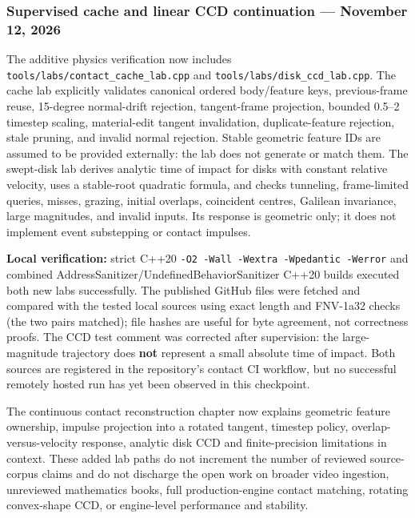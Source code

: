 \subsubsection{Supervised cache and linear CCD continuation --- November 12, 2026}\label{appendix-3b67654799a2-supervised-cache-and-linear-ccd-continuation-november-12-2026}

The additive physics verification now includes \texttt{tools/labs/contact\_cache\_lab.cpp} and \texttt{tools/labs/disk\_ccd\_lab.cpp}. The cache lab explicitly validates canonical ordered body/feature keys, previous-frame reuse, 15-degree normal-drift rejection, tangent-frame projection, bounded 0.5--2 timestep scaling, material-edit tangent invalidation, duplicate-feature rejection, stale pruning, and invalid normal rejection. Stable geometric feature IDs are assumed to be provided externally: the lab does not generate or match them. The swept-disk lab derives analytic time of impact for disks with constant relative velocity, uses a stable-root quadratic formula, and checks tunneling, frame-limited queries, misses, grazing, initial overlaps, coincident centres, Galilean invariance, large magnitudes, and invalid inputs. Its response is geometric only; it does not implement event substepping or contact impulses.

\textbf{Local verification:} strict C++20 \texttt{-O2\ -Wall\ -Wextra\ -Wpedantic\ -Werror} and combined AddressSanitizer/UndefinedBehaviorSanitizer C++20 builds executed both new labs successfully. The published GitHub files were fetched and compared with the tested local sources using exact length and FNV-1a32 checks (the two pairs matched); file hashes are useful for byte agreement, not correctness proofs. The CCD test comment was corrected after supervision: the large-magnitude trajectory does \textbf{not} represent a small absolute time of impact. Both sources are registered in the repository's contact CI workflow, but no successful remotely hosted run has yet been observed in this checkpoint.

The continuous contact reconstruction chapter now explains geometric feature ownership, impulse projection into a rotated tangent, timestep policy, overlap-versus-velocity response, analytic disk CCD and finite-precision limitations in context. These added lab paths do not increment the number of reviewed source-corpus claims and do not discharge the open work on broader video ingestion, unreviewed mathematics books, full production-engine contact matching, rotating convex-shape CCD, or engine-level performance and stability.

